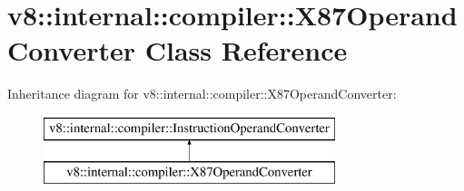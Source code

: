 \hypertarget{classv8_1_1internal_1_1compiler_1_1_x87_operand_converter}{}\section{v8\+:\+:internal\+:\+:compiler\+:\+:X87\+Operand\+Converter Class Reference}
\label{classv8_1_1internal_1_1compiler_1_1_x87_operand_converter}
Inheritance diagram for v8\+:\+:internal\+:\+:compiler\+:\+:X87\+Operand\+Converter\+:\begin{figure}[H]
\begin{center}
\leavevmode
\includegraphics[height=2.000000cm]{classv8_1_1internal_1_1compiler_1_1_x87_operand_converter}
\end{center}
\end{figure}
